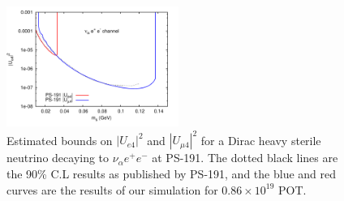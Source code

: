 \documentclass[11pt, a4paper]{article}
\newcommand{\refref}[1]{Ref.~\cite{#1}}
\def\ster{\ensuremath N}
\newcommand{\newtext}[2]{\textcolor{#1}{\ul{#2}}}
\begin{document}
\begin{figure}
			  \centering
			 
\includegraphics[width=0.5\textwidth]{figures/PS-191_test.pdf}

\caption{\label{fig:ps191test} Estimated bounds on $|U_{e4}|^2$ and $|U_{\mu
4}|^2$ for a Dirac heavy sterile neutrino decaying to $\nu_\alpha e^+ e^-$ at
PS-191. The dotted black lines are the 90\% C.L results as published by PS-191,
and the blue and red curves are the results of our simulation for $0.86 \times
10^{19}$ POT.}

\end{figure}

%
%
%
%
%
%
%
%
%



{}
\end{document}
